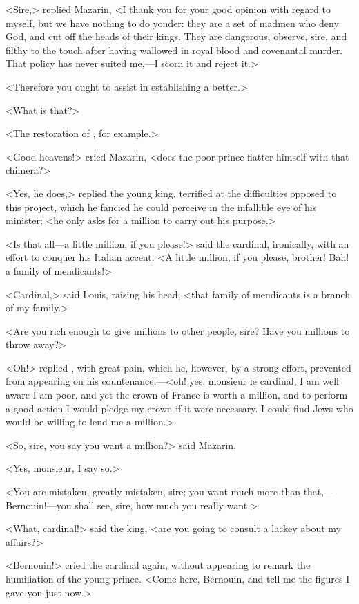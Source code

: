 <Sire,> replied Mazarin, <I thank you for your good opinion with regard to myself, but we have nothing to do yonder: they are a set of madmen who deny God, and cut off the heads of their kings. They are dangerous, observe, sire, and filthy to the touch after having wallowed in royal blood and covenantal murder. That policy has never suited me,—I scorn it and reject it.>

<Therefore you ought to assist in establishing a better.>

<What is that?>

<The restoration of , for example.>

<Good heavens!> cried Mazarin, <does the poor prince flatter himself with that chimera?>

<Yes, he does,> replied the young king, terrified at the difficulties opposed to this project, which he fancied he could perceive in the infallible eye of his minister; <he only asks for a million to carry out his purpose.>

<Is that all—a little million, if you please!> said the cardinal, ironically, with an effort to conquer his Italian accent. <A little million, if you please, brother! Bah! a family of mendicants!>

<Cardinal,> said Louis, raising his head, <that family of mendicants is a branch of my family.>

<Are you rich enough to give millions to other people, sire? Have you millions to throw away?>

<Oh!> replied , with great pain, which he, however, by a strong effort, prevented from appearing on his countenance;—<oh! yes, monsieur le cardinal, I am well aware I am poor, and yet the crown of France is worth a million, and to perform a good action I would pledge my crown if it were necessary. I could find Jews who would be willing to lend me a million.>

<So, sire, you say you want a million?> said Mazarin.

<Yes, monsieur, I say so.>

<You are mistaken, greatly mistaken, sire; you want much more than that,—Bernouin!—you shall see, sire, how much you really want.>

<What, cardinal!> said the king, <are you going to consult a lackey about my affairs?>

<Bernouin!> cried the cardinal again, without appearing to remark the humiliation of the young prince. <Come here, Bernouin, and tell me the figures I gave you just now.>

